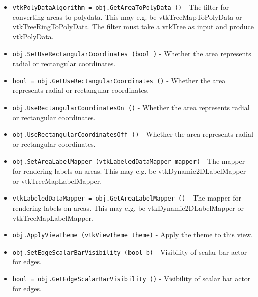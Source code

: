 \begin{itemize}
\item  \verb|vtkPolyDataAlgorithm = obj.GetAreaToPolyData ()| -  The filter for converting areas to polydata. This may e.g. be
 vtkTreeMapToPolyData or vtkTreeRingToPolyData.
 The filter must take a vtkTree as input and produce vtkPolyData.

\item  \verb|obj.SetUseRectangularCoordinates (bool )| -  Whether the area represents radial or rectangular coordinates.

\item  \verb|bool = obj.GetUseRectangularCoordinates ()| -  Whether the area represents radial or rectangular coordinates.

\item  \verb|obj.UseRectangularCoordinatesOn ()| -  Whether the area represents radial or rectangular coordinates.

\item  \verb|obj.UseRectangularCoordinatesOff ()| -  Whether the area represents radial or rectangular coordinates.

\item  \verb|obj.SetAreaLabelMapper (vtkLabeledDataMapper mapper)| -  The mapper for rendering labels on areas. This may e.g. be
 vtkDynamic2DLabelMapper or vtkTreeMapLabelMapper.

\item  \verb|vtkLabeledDataMapper = obj.GetAreaLabelMapper ()| -  The mapper for rendering labels on areas. This may e.g. be
 vtkDynamic2DLabelMapper or vtkTreeMapLabelMapper.

\item  \verb|obj.ApplyViewTheme (vtkViewTheme theme)| -  Apply the theme to this view.

\item  \verb|obj.SetEdgeScalarBarVisibility (bool b)| -  Visibility of scalar bar actor for edges.

\item  \verb|bool = obj.GetEdgeScalarBarVisibility ()| -  Visibility of scalar bar actor for edges.

\end{itemize}
